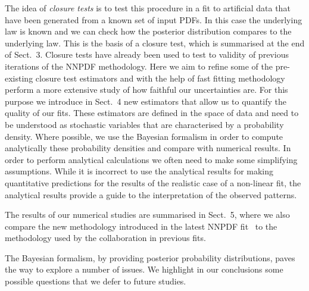 The idea of {\em closure tests} is to test this procedure in a fit to artificial
data that have been generated from a known set of input PDFs. In this case the
underlying law is known and we can check how the posterior distribution compares
to the underlying law. This is the basis of a closure test, which is summarised
at the end of Sect.~3. Closure tests have already been used to test to validity
of previous iterations of the NNPDF methodology. Here we aim to refine some of
the pre-existing closure test estimators and with the help of fast fitting
methodology perform a more extensive study of how faithful our uncertainties
are. For this purpose we introduce in Sect.~4 new estimators that allow us to
quantify the quality of our fits. These estimators are defined in the space of
data and need to be understood as stochastic variables that are characterised by
a probability density. Where possible, we use the Bayesian formalism in order to
compute analytically these probability densities and compare with numerical
results. In order to perform analytical calculations we often need to make some
simplifying assumptions. While it is incorrect to use the analytical results for
making quantitative predictions for the results of the realistic case of a
non-linear fit, the analytical results provide a guide to the interpretation of
the observed patterns. 

The results of our numerical studies are summarised in Sect.~5, where we also
compare the new methodology introduced in the latest NNPDF
fit~\cite{Ball:2021leu} to the methodology used by the collaboration in previous
fits. 
 
The Bayesian formalism, by providing posterior probability distributions, paves
the way to explore a number of issues. We highlight in our conclusions some
possible questions that we defer to future studies. 